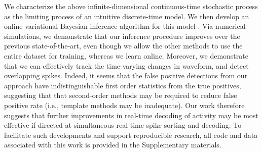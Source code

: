We characterize the above infinite-dimensional continuous-time stochastic process as the limiting process of an intuitive discrete-time model.  
We then develop an online variational Bayesian inference algorithm for this model \cite{??}.  Via numerical simulations, we demonstrate that our inference procedure improves over the previous state-of-the-art, even though we allow the other methods to use the entire dataset for training, whereas we learn online.  Moreover, we demonstrate that we can effectively track the time-varying changes in waveform, and detect overlapping spikes.  Indeed, it seems that the false positive detections from our approach have indistinguishable first order statistics from the true positives, suggesting that that second-order methods may be required to reduce false positive rate (i.e., template methods may be inadequate).  Our work therefore suggests that further improvements in real-time decoding of activity may be most effective if directed at simultaneous real-time spike sorting and decoding.  To facilitate such developments and support reproducible research, all code and data associated with this work is provided in the Supplementary materials.
